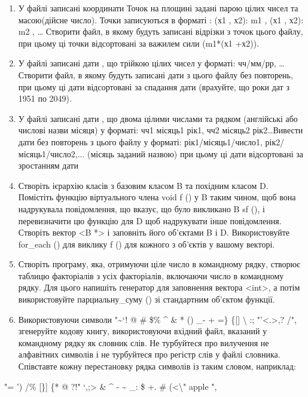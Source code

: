 \documentclass[]{article}
\makeatletter
\newcommand{\xslalph}[1]{\expandafter\@xslalph\csname c@#1\endcsname}
\newcommand{\@xslalph}[1]{%
    \ifcase#1\or а\or б\or в\or г\or д\or e\or є\or ж\or з\or i%
    \or й\or к\or л\or м\or н\or о\or п\or р\or с\or т%
    \or у\or ф\or х\or ц\or ч\or ш\or ю\or я\or аа\or бб\or вв%
    \else\@ctrerr\fi%
}
\makeatother
\begin{document}
\begin{enumerate}
\begin{enumerate}[label=\xslalph*)]
\begin{enumerate}
\begin{enumerate}[label=\xslalph*)]
\begin{enumerate}
\def\labelenumi{\arabic{enumi})}
\item
  У файлі записані координати Точок на площині задані парою цілих чисел
  та масою(дійсне число). Точки записуються в форматі : (х1 , х2): m1 ,
  (х1 , х2): m2 , \ldots{} Створити файл, в якому будуть записані
  відрізки з точок цього файлу, при цьому ці точки відсортовані за
  важилем сили (m1*(х1 +х2)).
\item
  У файлі записані дати , що трійкою цілих чисел у форматі: чч/мм/рр,
  \ldots{} Створити файл, в якому будуть записані дати з цього файлу без
  повторень, при цьому ці дати відсортовані за спадання дати (врахуйте,
  що роки дат з 1951 по 2049).
\item
  У файлі записані дати , що двома цілими числами та рядком (англійські
  або числові назви місяця) у форматі: чч1 місяць1 рік1, чч2 місяць2
  рік2\ldots{}Вивести дати без повторень з цього файлу у форматі:
  рік1/місяць1/число1, рік2/місяць1/число2,... (місяць заданий назвою)
  при цьому ці дати відсортовані за зростанням дати
\item
  Створіть ієрархію класів з базовим класом B та похідним класом D.
  Помістіть функцію віртуального члена void f () у B таким чином, щоб
  вона надрукувала повідомлення, що вказує, що було викликано B sf (), і
  перевизначити цю функцію для D щоб надрукувати інше повідомлення.
  Створіть вектор \textless{}B *\textgreater{} і заповніть його
  об'єктами B і D. Використовуйте for\_each () для виклику f () для
  кожного з об'єктів у вашому векторі.
\item
  Створіть програму, яка, отримуючи ціле число в командному рядку,
  створює таблицю факторіалів з усіх факторіалів, включаючи число в
  командному рядку. Для цього напишіть генератор для заповнення вектора
  \textless{}int\textgreater{}, а потім використовуйте парциальну\_суму
  () зі стандартним об'єктом функції.
\item
  Використовуючи символи "\textasciitilde{}`! @ \# \$\% \^{} \& * () \_-
  + =\} \{{[}{]} \textbar{} \textbackslash{} :;
  "'\textless{}.\textgreater{},? /", згенеруйте кодову книгу,
  використовуючи вхідний файл, вказаний у командному рядку як словник
  слів. Не турбуйтеся про вилучення не алфавітних символів і не
  турбуйтеся про регістр слів у файлі словника. Співставте кожну
  перестановку рядка символів із таким словом, наприклад:
\end{enumerate}

"= ') /\% {[}\}{]} \textbar{} \{* @ ?!" `,;\textgreater{} \& \^{} -
\textasciitilde{} \_: \$ +. \# (\textless{}\textbackslash{}" apple ",


\end{enumerate}
\end{enumerate}
\end{enumerate}
\end{enumerate}
\end{document}
